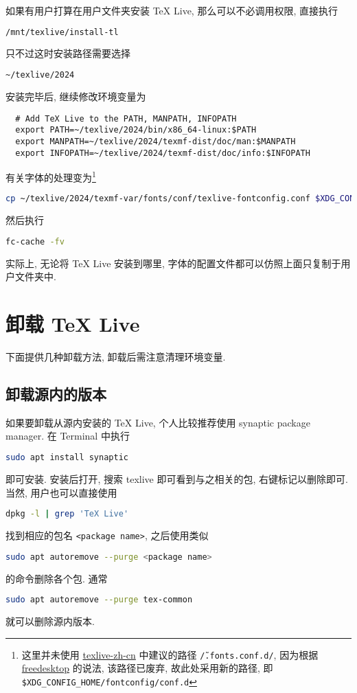 如果有用户打算在用户文件夹安装 \TeX{} Live,
那么可以不必调用权限,
直接执行
\begin{lstlisting}[language=bash]
  /mnt/texlive/install-tl
\end{lstlisting}
只不过这时安装路径需要选择
\begin{lstlisting}[language=bash]
  ~/texlive/2024
\end{lstlisting}
安装完毕后,
继续修改环境变量为
\begin{lstlisting}
  # Add TeX Live to the PATH, MANPATH, INFOPATH
  export PATH=~/texlive/2024/bin/x86_64-linux:$PATH
  export MANPATH=~/texlive/2024/texmf-dist/doc/man:$MANPATH
  export INFOPATH=~/texlive/2024/texmf-dist/doc/info:$INFOPATH
\end{lstlisting}
有关字体的处理变为\footnote{这里并未使用 \href{https://tug.org/texlive/doc/texlive-zh-cn/texlive-zh-cn.pdf}{texlive-zh-cn} 中建议的路径 \texttt{\~/.fonts.conf.d/},
因为根据 \href{https://www.freedesktop.org/software/fontconfig/fontconfig-user.html}{freedesktop} 的说法,
该路径已废弃,
故此处采用新的路径,
即 \texttt{\$XDG\_CONFIG\_HOME/fontconfig/conf.d}}
\begin{lstlisting}[language=bash]
  cp ~/texlive/2024/texmf-var/fonts/conf/texlive-fontconfig.conf $XDG_CONFIG_HOME/fontconfig/conf.d/09-texlive.conf
\end{lstlisting}
然后执行
\begin{lstlisting}[language=bash]
  fc-cache -fv
\end{lstlisting}
实际上,
无论将 \TeX{} Live 安装到哪里,
字体的配置文件都可以仿照上面只复制于用户文件夹中.

\section{卸载 \TeX{} Live}\label{sec:ubuntu:uninstall}

下面提供几种卸载方法,
卸载后需注意清理环境变量.

\subsection{卸载源内的版本}\label{sec:ubuntu:aptremove}

如果要卸载从源内安装的 \TeX{} Live, 个人比较推荐使用 synaptic package manager.
在 \textsf{Terminal} 中执行
\begin{lstlisting}[language = bash]
  sudo apt install synaptic
\end{lstlisting}
即可安装.
安装后打开, 搜索 \textsf{texlive} 即可看到与之相关的包, 右键标记以删除即可.
当然, 用户也可以直接使用
\begin{lstlisting}[language = bash]
  dpkg -l | grep 'TeX Live'
\end{lstlisting}
找到相应的包名 \texttt{<package name>}, 之后使用类似
\begin{lstlisting}[language = bash]
  sudo apt autoremove --purge <package name>
\end{lstlisting}
的命令删除各个包.
通常
\begin{lstlisting}[language = bash]
  sudo apt autoremove --purge tex-common
\end{lstlisting}
就可以删除源内版本.

